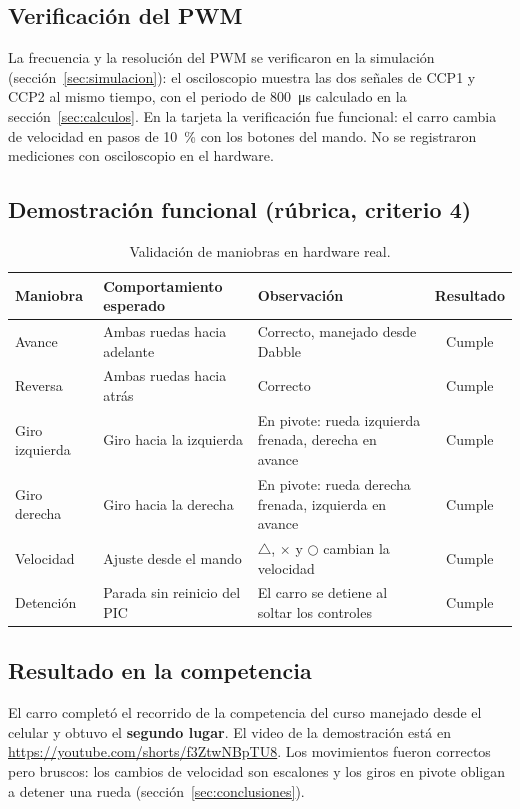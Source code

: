 \subsection{Verificación del PWM}

La frecuencia y la resolución del PWM se verificaron en la simulación
(sección~\ref{sec:simulacion}): el osciloscopio muestra las dos señales de
CCP1 y CCP2 al mismo tiempo, con el periodo de \SI{800}{\micro\second}
calculado en la sección~\ref{sec:calculos}. En la tarjeta la verificación fue
funcional: el carro cambia de velocidad en pasos de \SI{10}{\percent} con los
botones del mando. No se registraron mediciones con osciloscopio en el
hardware.

\subsection{Demostración funcional (rúbrica, criterio 4)}

\begin{table}[H]
  \centering
  \caption{Validación de maniobras en hardware real.}
  \label{tab:demostracion}
  \small
  \begin{tabularx}{\textwidth}{@{}l L L c@{}}
    \toprule
    \textbf{Maniobra} & \textbf{Comportamiento esperado} & \textbf{Observación} & \textbf{Resultado} \\
    \midrule
    Avance         & Ambas ruedas hacia adelante & Correcto, manejado desde Dabble & Cumple \\
    Reversa        & Ambas ruedas hacia atrás    & Correcto & Cumple \\
    Giro izquierda & Giro hacia la izquierda     & En pivote: rueda izquierda frenada, derecha en avance & Cumple \\
    Giro derecha   & Giro hacia la derecha       & En pivote: rueda derecha frenada, izquierda en avance & Cumple \\
    Velocidad      & Ajuste desde el mando       & $\triangle$, $\times$ y $\bigcirc$ cambian la velocidad & Cumple \\
    Detención      & Parada sin reinicio del PIC & El carro se detiene al soltar los controles & Cumple \\
    \bottomrule
  \end{tabularx}
\end{table}

\subsection{Resultado en la competencia}

El carro completó el recorrido de la competencia del curso manejado desde el
celular y obtuvo el \textbf{segundo lugar}. El video de la demostración está en
\url{https://youtube.com/shorts/f3ZtwNBpTU8}. Los movimientos fueron
correctos pero bruscos: los cambios de velocidad son escalones y los giros en
pivote obligan a detener una rueda (sección~\ref{sec:conclusiones}).
